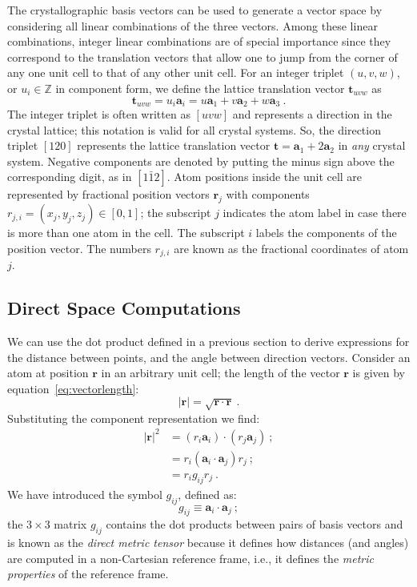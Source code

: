 The crystallographic basis vectors can be used to generate a vector space by considering all linear combinations of the three vectors. Among these linear combinations, integer linear combinations are of special importance since they correspond to the translation vectors that allow one to jump from the corner of any one unit cell to that of any other unit cell.  For an integer triplet $(u,v,w)$, or $u_i\in\mathbb{Z}$ in component form, we define the lattice translation vector $\mathbf{t}_{uvw}$ as
\begin{equation}
	\mathbf{t}_{uvw} = u_i\mathbf{a}_i = u\mathbf{a}_1+v\mathbf{a}_2+w\mathbf{a}_3 \ .
\end{equation}
The integer triplet is often written as $[uvw]$ and represents a direction in the crystal lattice; this notation is valid for all crystal systems. So, the direction triplet $[120]$ represents the lattice translation vector $\mathbf{t}=\mathbf{a}_1+2\mathbf{a}_2$ in \textit{any} crystal system. Negative components are denoted by putting the minus sign above the corresponding digit, as in $[1\bar{1}2]$. Atom positions inside the unit cell are represented by fractional position vectors $\mathbf{r}_j$ with components $r_{j,i}=(x_j,y_j,z_j)\in [0,1]$; the subscript $j$ indicates the atom label in case there is more than one atom in the cell.  The subscript $i$ labels the components of the position vector. The numbers $r_{j,i}$ are known as the fractional coordinates of atom $j$.

\subsection{Direct Space Computations} 
We can use the dot product defined in a previous section to derive expressions for the distance between points, and the angle between direction vectors. Consider an atom at position $\mathbf{r}$ in an arbitrary unit cell; the length of the vector $\mathbf{r}$ is given by equation~\ref{eq:vectorlength}:
\[
	\vert\mathbf{r}\vert = \sqrt{\mathbf{r}\cdot\mathbf{r}} \ .
\]
Substituting the component representation we find:
\begin{align}
	\vert\mathbf{r}\vert^2 &= (r_i\mathbf{a}_i)\cdot(r_j\mathbf{a}_j)\ ;\nonumber\\
	&= r_i (\mathbf{a}_i\cdot\mathbf{a}_j) r_j\ ;\nonumber\\
	&= r_i g_{ij} r_j\ .\label{eq:vectorlength}
\end{align}
We have introduced the symbol $g_{ij}$, defined as:
\begin{equation}
	g_{ij} \equiv \mathbf{a}_i\cdot\mathbf{a}_j \ ;\label{eq:gdirectdef}
\end{equation}
the $3\times 3$ matrix $g_{ij}$ contains the dot products between pairs of basis vectors and is known as the \textit{direct metric tensor} because it defines how distances (and angles) are computed in a non-Cartesian reference frame, i.e., it defines the \textit{metric properties} of the reference frame.

